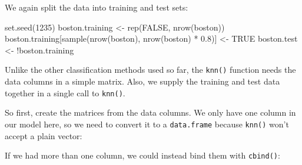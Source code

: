 \documentclass[
]{book}
\newenvironment{Shaded}{\begin{snugshade}}{\end{snugshade}}
\newcommand{\ConstantTok}[1]{\textcolor[rgb]{0.00,0.00,0.00}{#1}}
\newcommand{\DecValTok}[1]{\textcolor[rgb]{0.00,0.00,0.81}{#1}}
\newcommand{\FloatTok}[1]{\textcolor[rgb]{0.00,0.00,0.81}{#1}}
\newcommand{\FunctionTok}[1]{\textcolor[rgb]{0.00,0.00,0.00}{#1}}
\newcommand{\NormalTok}[1]{#1}
\newcommand{\OtherTok}[1]{\textcolor[rgb]{0.56,0.35,0.01}{#1}}
\newcommand{\SpecialCharTok}[1]{\textcolor[rgb]{0.00,0.00,0.00}{#1}}
\begin{document}
We again split the data into training and test sets:

\begin{Shaded}
\begin{Highlighting}[]
\FunctionTok{set.seed}\NormalTok{(}\DecValTok{1235}\NormalTok{)}
\NormalTok{boston.training }\OtherTok{\textless{}{-}} \FunctionTok{rep}\NormalTok{(}\ConstantTok{FALSE}\NormalTok{, }\FunctionTok{nrow}\NormalTok{(boston))}
\NormalTok{boston.training[}\FunctionTok{sample}\NormalTok{(}\FunctionTok{nrow}\NormalTok{(boston), }\FunctionTok{nrow}\NormalTok{(boston) }\SpecialCharTok{*} \FloatTok{0.8}\NormalTok{)] }\OtherTok{\textless{}{-}} \ConstantTok{TRUE}
\NormalTok{boston.test }\OtherTok{\textless{}{-}} \SpecialCharTok{!}\NormalTok{boston.training}
\end{Highlighting}
\end{Shaded}

Unlike the other classification methods used so far, the \texttt{knn()} function needs the data columns in a simple matrix. Also, we supply the training and test data together in a single call to \texttt{knn()}.

So first, create the matrices from the data columns. We only have one column in our model here, so we need to convert it to a \texttt{data.frame} because \texttt{knn()} won't accept a plain vector:

\begin{Shaded}
\end{Shaded}

If we had more than one column, we could instead bind them with \texttt{cbind()}:

\begin{Shaded}
\end{Shaded}
\end{document}
